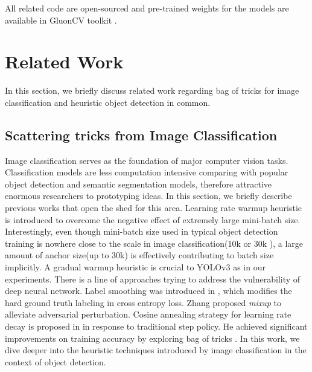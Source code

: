 \documentclass[10pt,twocolumn,letterpaper]{article}
\begin{document}
All related code are open-sourced and pre-trained weights for the models are available in GluonCV toolkit \cite{gluoncv}.

\section{Related Work}
\label{sec:related}
In this section, we briefly discuss related work regarding bag of tricks for image classification and heuristic object detection in common.

\subsection{Scattering tricks from Image Classification}
Image classification serves as the foundation of major computer vision tasks. Classification models are less computation intensive comparing with popular object detection and semantic segmentation models, therefore attractive enormous researchers to prototyping ideas. In this section, we briefly describe previous works that open the shed for this area. Learning rate warmup heuristic \cite{goyal2017accurate} is introduced to overcome the negative effect of extremely large mini-batch size. Interestingly, even though mini-batch size used in typical object detection training is nowhere close to the scale in image classification(\eg 10k or 30k \cite{goyal2017accurate}), a large amount of anchor size(up to 30k) is effectively contributing to batch size implicitly. A gradual warmup heuristic is crucial to YOLOv3 \cite{redmon2018yolov3} as in our experiments. There is a line of approaches trying to address the vulnerability of deep neural network. Label smoothing was introduced in \cite{szegedy2016rethinking}, which modifies the hard ground truth labeling in cross entropy loss. Zhang \etal \cite{zhang2017mixup} proposed \textit{mixup} to alleviate adversarial perturbation. Cosine annealing strategy for learning rate decay is proposed in \cite{loshchilov2016sgdr} in response to traditional step policy. He \etal achieved significant improvements on training accuracy by exploring bag of tricks \cite{he2018bag}. In this work, we dive deeper into the heuristic techniques introduced by image classification in the context of object detection. 
\end{document}
